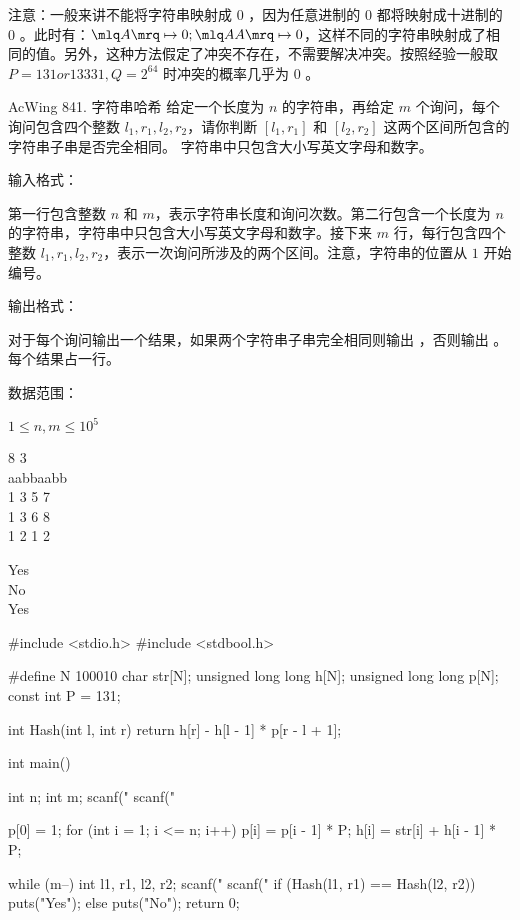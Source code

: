 注意：一般来讲不能将字符串映射成 $0$ ，因为任意进制的 $0$ 都将映射成十进制的 $0$ 。此时有：$\mlq A \mrq \mapsto 0; \mlq AA \mrq \mapsto 0$，这样不同的字符串映射成了相同的值。另外，这种方法假定了冲突不存在，不需要解决冲突。按照经验一般取 $P = 131 or 13331, Q = 2^{64}$ 时冲突的概率几乎为 $0$ 。

\begin{titledbox}{AcWing 841. 字符串哈希}
    给定一个长度为 $n$ 的字符串，再给定 $m$ 个询问，每个询问包含四个整数 $l_1, r_1, l_2, r_2$，请你判断 $[l_1, r_1]$ 和 $[l_2, r_2]$ 这两个区间所包含的字符串子串是否完全相同。
    字符串中只包含大小写英文字母和数字。

    输入格式：

    第一行包含整数 $n$ 和 $m$，表示字符串长度和询问次数。第二行包含一个长度为 $n$ 的字符串，字符串中只包含大小写英文字母和数字。接下来 $m$ 行，每行包含四个整数 $l_1, r_1, l_2, r_2$，表示一次询问所涉及的两个区间。注意，字符串的位置从 $1$ 开始编号。

    输出格式：

    对于每个询问输出一个结果，如果两个字符串子串完全相同则输出  ，否则输出 。每个结果占一行。

    数据范围：

    $1 \le n, m \le 10^5$

    \begin{inputblock}
        8 3 \\
        aabbaabb \\
        1 3 5 7 \\
        1 3 6 8 \\
        1 2 1 2
    \end{inputblock}
    \begin{outputblock}
        Yes \\
        No \\
        Yes
    \end{outputblock}
\end{titledbox}

\begin{mycpptwocol}[字符串前缀哈希法]
    #include <stdio.h>
    #include <stdbool.h>

    #define N 100010
    char str[N];
    unsigned long long h[N];
    unsigned long long p[N];
    const int P = 131;

    int Hash(int l, int r) {
        return h[r] - h[l - 1] * p[r - l + 1];
    }

    int main() {
        int n;
        int m;
        scanf("%
        scanf("%

        p[0] = 1;
        for (int i = 1; i <= n; i++) {
            p[i] = p[i - 1] * P;
            h[i] = str[i] + h[i - 1] * P;
        }

        while (m--) {
            int l1, r1, l2, r2;
            scanf("%
            scanf("%
            if (Hash(l1, r1) == Hash(l2, r2)) {
                puts("Yes");
            } else {
                puts("No");
            }
        }
        return 0;
    }
\end{mycpptwocol}

